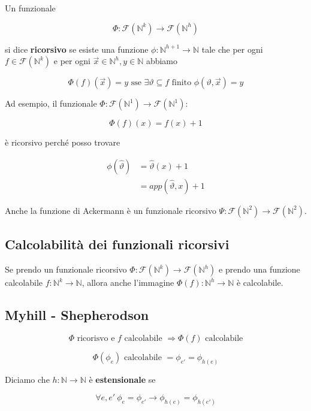 Un funzionale

$$
\Phi : \mathcal{F}(\mathbb{N}^k) \rightarrow  \mathcal{F}(\mathbb{N}^h) 
$$

si dice \textbf{ricorsivo} se esiste una funzione $\phi : \mathbb{N}^{h+1}\rightarrow \mathbb{N}$ tale che per ogni $f \in \mathcal{F}(\mathbb{N}^k)$ e per ogni $\vec{x} \in \mathbb{N}^h, y \in \mathbb{N}$  abbiamo

$$
\Phi(f)(\vec{x})  = y \text{ sse } \exists \vartheta \subseteq f \text{ finito } \phi(\vartheta, \vec{x}) = y
$$

Ad esempio, il funzionale $\Phi : \mathcal{F}(\mathbb{N}^1) \rightarrow  \mathcal{F}(\mathbb{N}^1) $:

$$
\Phi(f)(x) = f(x) +1
$$

è ricorsivo perché posso trovare

\begin{align*}
	\phi(\hat{\vartheta}) &= \hat{\vartheta}(x) +1 \\
										&= app(\hat{\vartheta} ,x) +1
\end{align*}

Anche la funzione di Ackermann è un funzionale ricorsivo $\Psi : \mathcal{F}(\mathbb{N}^2) \rightarrow  \mathcal{F}(\mathbb{N}^2) $.

\subsection{Calcolabilità dei funzionali ricorsivi}

Se prendo un funzionale ricorsivo $\Phi : \mathcal{F}(\mathbb{N}^k) \rightarrow  \mathcal{F}(\mathbb{N}^h) $ e prendo una funzione calcolabile $f : \mathbb{N}^k \rightarrow \mathbb{N}$, allora anche l'immagine $\Phi(f) : \mathbb{N}^h \rightarrow \mathbb{N}$ è calcolabile.

\subsection{Myhill - Shepherodson}

$$
\Phi \text{ ricorisvo e } f \text{ calcolabile } \Rightarrow \Phi(f) \text{ calcolabile}
$$

$$
\Phi(\phi_e) \text{ calcolabile } = \phi_{e'} = \phi_{h(e)}
$$

Diciamo che $h : \mathbb{N} \rightarrow \mathbb{N}$ è \textbf{estensionale} se

$$
\forall e, e' \: \phi_e = \phi_{e'} \rightarrow \phi_{h(e)} = \phi_{h(e')}
$$

